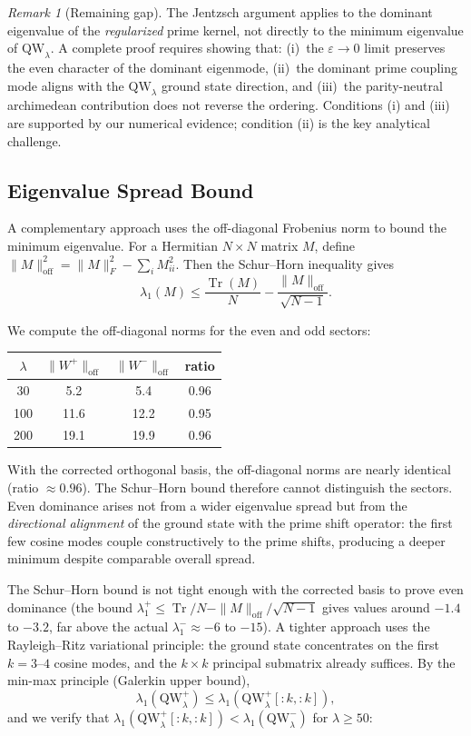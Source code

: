 \documentclass[12pt,a4paper]{article}
\theoremstyle{definition}
\theoremstyle{remark}
\newtheorem{remark}[theorem]{Remark}
\begin{document}
\begin{remark}[Remaining gap]
The Jentzsch argument applies to the dominant eigenvalue of the \emph{regularized} prime kernel, not directly to the minimum eigenvalue of $\mathrm{QW}_\lambda$. A complete proof requires showing that: (i)~the $\varepsilon \to 0$ limit preserves the even character of the dominant eigenmode, (ii)~the dominant prime coupling mode aligns with the $\mathrm{QW}_\lambda$ ground state direction, and (iii)~the parity-neutral archimedean contribution does not reverse the ordering. Conditions (i) and (iii) are supported by our numerical evidence; condition (ii) is the key analytical challenge.
\end{remark}

\subsection{Eigenvalue Spread Bound}

A complementary approach uses the off-diagonal Frobenius norm to bound the minimum eigenvalue. For a Hermitian $N \times N$ matrix $M$, define $\|M\|_{\mathrm{off}}^2 = \|M\|_F^2 - \sum_i M_{ii}^2$. Then the Schur--Horn inequality gives
\[ \lambda_1(M) \leq \frac{\operatorname{Tr}(M)}{N} - \frac{\|M\|_{\mathrm{off}}}{\sqrt{N-1}}. \]

We compute the off-diagonal norms for the even and odd sectors:

\begin{center}
\begin{tabular}{cccc}
$\lambda$ & $\|W^+\|_{\mathrm{off}}$ & $\|W^-\|_{\mathrm{off}}$ & ratio \\
\hline
30  & 5.2 & 5.4 & 0.96 \\
100 & 11.6 & 12.2 & 0.95 \\
200 & 19.1 & 19.9 & 0.96
\end{tabular}
\end{center}

With the corrected orthogonal basis, the off-diagonal norms are nearly identical (ratio $\approx 0.96$). The Schur--Horn bound therefore cannot distinguish the sectors. Even dominance arises not from a wider eigenvalue spread but from the \emph{directional alignment} of the ground state with the prime shift operator: the first few cosine modes couple constructively to the prime shifts, producing a deeper minimum despite comparable overall spread.

The Schur--Horn bound is not tight enough with the corrected basis to prove even dominance (the bound $\lambda_1^+ \leq \operatorname{Tr}/N - \|M\|_{\mathrm{off}}/\sqrt{N-1}$ gives values around $-1.4$ to $-3.2$, far above the actual $\lambda_1^- \approx -6$ to $-15$). A tighter approach uses the Rayleigh--Ritz variational principle: the ground state concentrates on the first $k = 3$--$4$ cosine modes, and the $k \times k$ principal submatrix already suffices. By the min-max principle (Galerkin upper bound),
\[ \lambda_1(\mathrm{QW}_\lambda^+) \leq \lambda_1(\mathrm{QW}_\lambda^+[{:}k,{:}k]), \]
and we verify that $\lambda_1(\mathrm{QW}_\lambda^+[{:}k,{:}k]) < \lambda_1(\mathrm{QW}_\lambda^-)$ for $\lambda \geq 50$:
\end{document}
